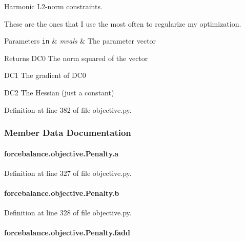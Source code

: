 Harmonic L2-\/norm constraints. 

These are the ones that I use the most often to regularize my optimization.


\begin{DoxyParams}[1]{Parameters}
\mbox{\tt in}  & {\em mvals} & The parameter vector \\
\hline
\end{DoxyParams}
\begin{DoxyReturn}{Returns}
D\-C0 The norm squared of the vector 

D\-C1 The gradient of D\-C0 

D\-C2 The Hessian (just a constant) 
\end{DoxyReturn}


Definition at line 382 of file objective.\-py.



\subsubsection{Member Data Documentation}
\hypertarget{classforcebalance_1_1objective_1_1Penalty_abab984da8a8f62adbd1decbaf56ac2fa}{
\paragraph[{a}]{\setlength{\rightskip}{0pt plus 5cm}forcebalance.\-objective.\-Penalty.\-a}}\label{classforcebalance_1_1objective_1_1Penalty_abab984da8a8f62adbd1decbaf56ac2fa}


Definition at line 327 of file objective.\-py.

\hypertarget{classforcebalance_1_1objective_1_1Penalty_a0d9da5669d74dfd54a2fc639424e37b6}{
\paragraph[{b}]{\setlength{\rightskip}{0pt plus 5cm}forcebalance.\-objective.\-Penalty.\-b}}\label{classforcebalance_1_1objective_1_1Penalty_a0d9da5669d74dfd54a2fc639424e37b6}


Definition at line 328 of file objective.\-py.

\hypertarget{classforcebalance_1_1objective_1_1Penalty_a8c93cd0cfa455a54f957a061b5f7ac50}{
\paragraph[{fadd}]{\setlength{\rightskip}{0pt plus 5cm}forcebalance.\-objective.\-Penalty.\-fadd}}\label{classforcebalance_1_1objective_1_1Penalty_a8c93cd0cfa455a54f957a061b5f7ac50}



